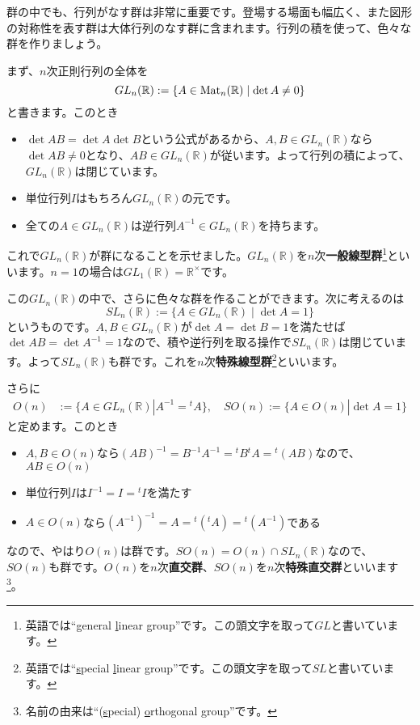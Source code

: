 群の中でも、行列がなす群は非常に重要です。登場する場面も幅広く、また図形の対称性を表す群は大体行列のなす群に含まれます。行列の積を使って、色々な群を作りましょう。


まず、$n$次正則行列の全体を
\[
GL_n(\mathbb{R}) := \{ A \in \operatorname{Mat}_n(\mathbb{R}) \mid \det A \neq 0 \}
\]
と書きます。このとき
\begin{itemize}
\item $\det AB = \det A \det B$という公式があるから、$A, B \in GL_n(\mathbb{R})$なら$\det AB \neq 0$となり、$AB \in GL_n(\mathbb{R})$が従います。よって行列の積によって、$GL_n(\mathbb{R})$は閉じています。
\item 単位行列$I$はもちろん$GL_n(\mathbb{R})$の元です。
\item 全ての$A \in GL_n(\mathbb{R})$は逆行列$A^{-1} \in GL_n(\mathbb{R})$を持ちます。
\end{itemize}
これで$GL_n(\mathbb{R})$が群になることを示せました。$GL_n(\mathbb{R})$を$n$次\textbf{一般線型群}\footnote{英語では``\uline{g}eneral \uline{l}inear group''です。この頭文字を取って$GL$と書いています。}といいます。$n = 1$の場合は$GL_1(\mathbb{R}) = \mathbb{R}^{\times}$です。

この$GL_n(\mathbb{R})$の中で、さらに色々な群を作ることができます。次に考えるのは
\[
SL_n(\mathbb{R}) := \{ A \in GL_n(\mathbb{R}) \mid \det A = 1\}
\]
というものです。$A, B \in GL_n(\mathbb{R})$が$\det A = \det B = 1$を満たせば$\det AB = \det A^{-1} = 1$なので、積や逆行列を取る操作で$SL_n(\mathbb{R})$は閉じています。よって$SL_n(\mathbb{R})$も群です。これを$n$次\textbf{特殊線型群}\footnote{英語では``\uline{s}pecial \uline{l}inear group''です。この頭文字を取って$SL$と書いています。}といいます。

さらに
\begin{align*}
O(n) &:= \{A \in GL_n(\mathbb{R}) | A^{-1} = {}^t\!A \}, \quad
SO(n) := \{A \in O(n) | \det A = 1 \}
\end{align*}
と定めます。このとき
\begin{itemize}
\item $A, B \in O(n)$なら$(AB)^{-1} = B^{-1} A^{-1} = {}^tB {}^t\!A = {}^t(AB)$なので、$AB \in O(n)$
\item 単位行列$I$は$I^{-1} = I = {}^t I$を満たす
\item $A \in O(n)$なら$(A^{-1})^{-1} = A = {}^t({}^t\!A) = {}^t(A^{-1})$である
\end{itemize}
なので、やはり$O(n)$は群です。$SO(n) = O(n) \cap SL_n(\mathbb{R})$なので、$SO(n)$も群です。$O(n)$を$n$次\textbf{直交群}、$SO(n)$を$n$次\textbf{特殊直交群}といいます\footnote{名前の由来は``(\uline{s}pecial) \uline{o}rthogonal group''です。}。

